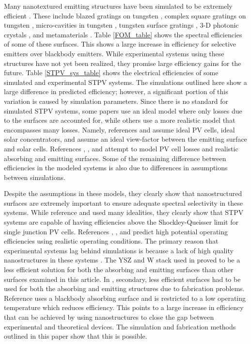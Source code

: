 \documentclass[10pt,letterpaper]{article}
\begin{document}
Many nanotextured emitting structures have been simulated to be extremely efficient \cite{paper2_ref13}.  These include blazed gratings on tungsten \cite{me2}, complex square gratings on tungsten \cite{paper2_ref14}, micro-cavities in tungsten \cite{paper2_ref6}, tungsten surface gratings \cite{paper1_ref6}, 3-D photonic crystals \cite{paper2_ref10}, and metamaterials \cite{meta}.  Table \ref{FOM_table} shows the spectral efficiencies of some of these surfaces.  This shows a large increase in efficiency for selective emitters over blackbody emitters.  While experimental systems using these structures have not yet been realized, they promise large efficiency gains for the future.  Table \ref{STPV_sys_table} shows the electrical efficiencies of some simulated and experimental STPV systems. 
The simulations outlined here show a large difference in predicted efficiency; however, a significant portion of this variation is caused by simulation parameters.  Since there is no standard for simulated STPV systems, some papers use an ideal model where only losses due to the surfaces are accounted for, while others use a more realistic model that encompasses many losses.  Namely, references \cite{RF_OptExp_2009} and \cite{global_opt} assume ideal PV cells, ideal solar concentrators, and assume an ideal view-factor between the emitting surface and solar cells.  References \cite{paper2_ref6}, \cite{me_thesis}, and \cite{NYL_SEMSC_2014} attempt to model PV cell losses and realistic absorbing and emitting surfaces.  Some of the remaining difference between efficiencies in the modeled systems is also due to differences in assumptions between simulations.

Despite the assumptions in these models, they clearly show that nanostructured surfaces are extremely important to ensure adequate spectral selectivity in these systems.  While reference \cite{RF_OptExp_2009} and \cite{global_opt} used many idealities, they clearly show that STPV systems are capable of having efficiencies above the Shockley-Queisser limit for single junction PV cells.  References \cite{paper2_ref6}, \cite{me_thesis}, and \cite{NYL_SEMSC_2014} predict high potential operating efficiencies using realistic operating conditions.  The primary reason that experimental systems lag behind simulations is because a lack of high quality nanostructures in these systems \cite{SKY_JPE_2015,me3}.  The YSZ and W stack used in \cite{SKY_JPE_2015} proved to be a less efficient solution for both the absorbing and emitting surfaces than other surfaces examined in this article.  In \cite{me3}, secondary, less efficient surfaces had to be used for both the absorbing and emitting structures due to fabrication problems.  Reference \cite{SKY_JPE_2015} uses a blackbody absorbing surface and is restricted to a low operating temperature which reduces efficiency.  This points to a large increase in efficiency that can be achieved by using nanostructures to close the gap between experimental and theoretical devices.  The simulation and fabrication methods outlined in this paper show that this is possible.
\end{document}

